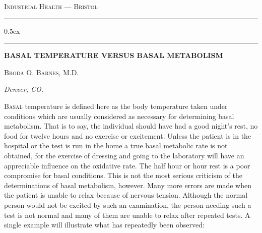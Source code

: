 \documentclass[10pt, letterpaper]{memoir}
\begin{document}
\begin{multicols}{2}

\noindent
\begin{minipage}[t]{\columnwidth}
    \sffamily\small\textsc{Industrial Health --- Bristol}
    \vspace{0.5ex}\par

    \hrule height 1pt \kern 0.5ex \hrule height 1pt
    \vspace{1.5em}\par

    {\parbox{\linewidth}{\raggedright\sffamily\bfseries\fontsize{18}{18}\selectfont\MakeUppercase{Basal Temperature Versus Basal Metabolism}}\par}
    \vspace{1.5em}\par

    {\sffamily\large\textsc{Broda O. Barnes, M.D.}\par}
    \vspace{0.4em}\par
    {\sffamily\normalsize\itshape Denver, CO.\par}

\end{minipage}%

\vspace{2em}

\lettrine[lines=3, findent=3pt, nindent=0pt]{B}{asal}
temperature is defined here as the body temperature taken under conditions which are usually considered as necessary for determining basal metabolism. That is to say, the individual should have had a good night's rest, no food for twelve hours and no exercise or excitement. Unless the patient is in the hospital or the test is run in the home a true basal metabolic rate is not obtained, for the exercise of dressing and going to the laboratory will have an appreciable influence on the oxidative rate. The half hour or hour rest is a poor compromise for basal conditions. This is not the most serious criticism of the determinations of basal metabolism, however. Many more errors are made when the patient is unable to relax because of nervous tension. Although the normal person would not be excited by such an examination, the person needing such a test is not normal and many of them are unable to relax after repeated tests. A single example will illustrate what has repeatedly been observed:


\end{multicols}
\end{document}
